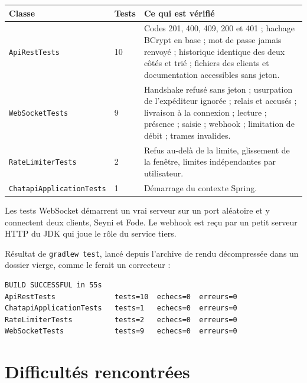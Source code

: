 \documentclass[11pt,a4paper]{article}
\newcommand{\tachesection}[1]{%
\needspace{6\baselineskip}%
\color{tachenavy}%
\section{#1}%
\color{black}%
}
\begin{document}
{\small\renewcommand{\arraystretch}{1.35}
\begin{tabular}{@{}L{4.3cm}L{1.2cm}L{9.7cm}@{}}
\toprule
\textbf{Classe} & \textbf{Tests} & \textbf{Ce qui est vérifié} \\
\midrule
\texttt{ApiRestTests} & 10 & Codes 201, 400, 409, 200 et 401 ; hachage BCrypt en base ; mot de passe jamais renvoyé ; historique identique des deux côtés et trié ; fichiers des clients et documentation accessibles sans jeton. \\
\texttt{WebSocketTests} & 9 & Handshake refusé sans jeton ; usurpation de l'expéditeur ignorée ; relais et accusés ; livraison à la connexion ; lecture ; présence ; saisie ; webhook ; limitation de débit ; trames invalides. \\
\texttt{RateLimiterTests} & 2 & Refus au-delà de la limite, glissement de la fenêtre, limites indépendantes par utilisateur. \\
\texttt{ChatapiApplicationTests} & 1 & Démarrage du contexte Spring. \\
\bottomrule
\end{tabular}}

Les tests WebSocket démarrent un vrai serveur sur un port aléatoire et y connectent deux clients, Seyni et Fode. Le webhook est reçu par un petit serveur HTTP du JDK qui joue le rôle du service tiers.

Résultat de \texttt{gradlew test}, lancé depuis l'archive de rendu décompressée dans un dossier vierge, comme le ferait un correcteur :

\begin{lstlisting}[style=code,columns=fixed,basewidth=0.5em]
BUILD SUCCESSFUL in 55s
ApiRestTests              tests=10  echecs=0  erreurs=0
ChatapiApplicationTests   tests=1   echecs=0  erreurs=0
RateLimiterTests          tests=2   echecs=0  erreurs=0
WebSocketTests            tests=9   echecs=0  erreurs=0
\end{lstlisting}

\FloatBarrier
\tachesection{Difficultés rencontrées}
\end{document}
